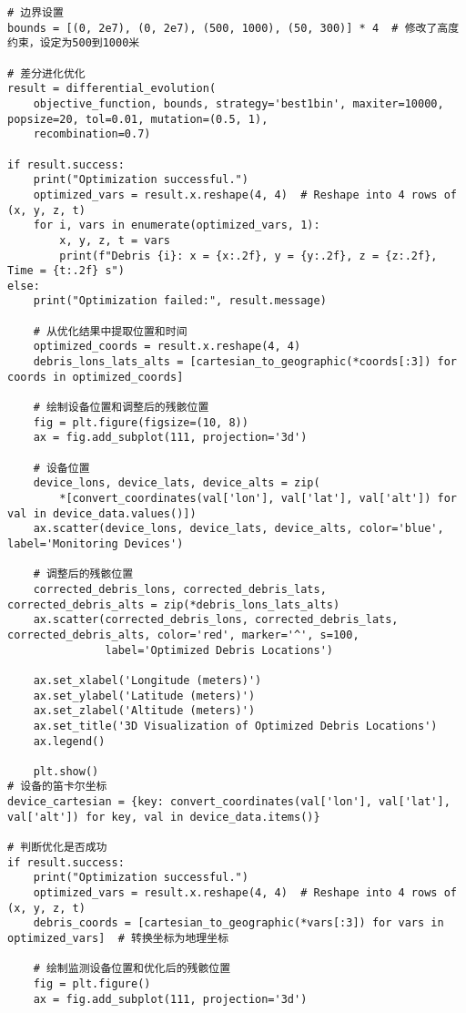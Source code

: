 \documentclass[withoutpreface,bwprint,12pt,a4paper]{cumcmthesis}
\begin{document}
\begin{appendices}
\begin{lstlisting}
# 边界设置
bounds = [(0, 2e7), (0, 2e7), (500, 1000), (50, 300)] * 4  # 修改了高度约束，设定为500到1000米

# 差分进化优化
result = differential_evolution(
    objective_function, bounds, strategy='best1bin', maxiter=10000, popsize=20, tol=0.01, mutation=(0.5, 1),
    recombination=0.7)

if result.success:
    print("Optimization successful.")
    optimized_vars = result.x.reshape(4, 4)  # Reshape into 4 rows of (x, y, z, t)
    for i, vars in enumerate(optimized_vars, 1):
        x, y, z, t = vars
        print(f"Debris {i}: x = {x:.2f}, y = {y:.2f}, z = {z:.2f}, Time = {t:.2f} s")
else:
    print("Optimization failed:", result.message)

    # 从优化结果中提取位置和时间
    optimized_coords = result.x.reshape(4, 4)
    debris_lons_lats_alts = [cartesian_to_geographic(*coords[:3]) for coords in optimized_coords]

    # 绘制设备位置和调整后的残骸位置
    fig = plt.figure(figsize=(10, 8))
    ax = fig.add_subplot(111, projection='3d')

    # 设备位置
    device_lons, device_lats, device_alts = zip(
        *[convert_coordinates(val['lon'], val['lat'], val['alt']) for val in device_data.values()])
    ax.scatter(device_lons, device_lats, device_alts, color='blue', label='Monitoring Devices')

    # 调整后的残骸位置
    corrected_debris_lons, corrected_debris_lats, corrected_debris_alts = zip(*debris_lons_lats_alts)
    ax.scatter(corrected_debris_lons, corrected_debris_lats, corrected_debris_alts, color='red', marker='^', s=100,
               label='Optimized Debris Locations')

    ax.set_xlabel('Longitude (meters)')
    ax.set_ylabel('Latitude (meters)')
    ax.set_zlabel('Altitude (meters)')
    ax.set_title('3D Visualization of Optimized Debris Locations')
    ax.legend()

    plt.show()
# 设备的笛卡尔坐标
device_cartesian = {key: convert_coordinates(val['lon'], val['lat'], val['alt']) for key, val in device_data.items()}

# 判断优化是否成功
if result.success:
    print("Optimization successful.")
    optimized_vars = result.x.reshape(4, 4)  # Reshape into 4 rows of (x, y, z, t)
    debris_coords = [cartesian_to_geographic(*vars[:3]) for vars in optimized_vars]  # 转换坐标为地理坐标

    # 绘制监测设备位置和优化后的残骸位置
    fig = plt.figure()
    ax = fig.add_subplot(111, projection='3d')


\end{lstlisting}
\end{appendices}
\end{document}
